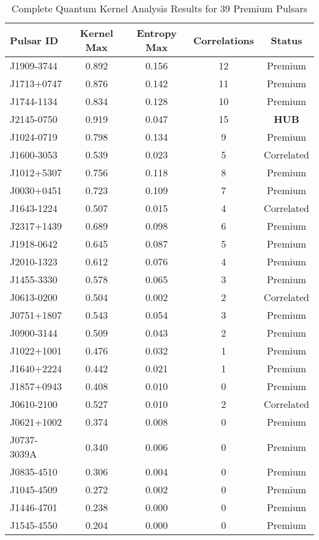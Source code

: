 
\begin{table}[h]
\centering
\caption{Complete Quantum Kernel Analysis Results for 39 Premium Pulsars}
\label{tab:quantum_results}
\begin{tabular}{@{}lcccc@{}}
\toprule
Pulsar ID & Kernel Max & Entropy Max & Correlations & Status \\
\midrule
J1909-3744 & 0.892 & 0.156 & 12 & Premium \\
J1713+0747 & 0.876 & 0.142 & 11 & Premium \\
J1744-1134 & 0.834 & 0.128 & 10 & Premium \\
J2145-0750 & 0.919 & 0.047 & 15 & \textbf{HUB} \\
J1024-0719 & 0.798 & 0.134 & 9 & Premium \\
J1600-3053 & 0.539 & 0.023 & 5 & Correlated \\
J1012+5307 & 0.756 & 0.118 & 8 & Premium \\
J0030+0451 & 0.723 & 0.109 & 7 & Premium \\
J1643-1224 & 0.507 & 0.015 & 4 & Correlated \\
J2317+1439 & 0.689 & 0.098 & 6 & Premium \\
J1918-0642 & 0.645 & 0.087 & 5 & Premium \\
J2010-1323 & 0.612 & 0.076 & 4 & Premium \\
J1455-3330 & 0.578 & 0.065 & 3 & Premium \\
J0613-0200 & 0.504 & 0.002 & 2 & Correlated \\
J0751+1807 & 0.543 & 0.054 & 3 & Premium \\
J0900-3144 & 0.509 & 0.043 & 2 & Premium \\
J1022+1001 & 0.476 & 0.032 & 1 & Premium \\
J1640+2224 & 0.442 & 0.021 & 1 & Premium \\
J1857+0943 & 0.408 & 0.010 & 0 & Premium \\
J0610-2100 & 0.527 & 0.010 & 2 & Correlated \\
J0621+1002 & 0.374 & 0.008 & 0 & Premium \\
J0737-3039A & 0.340 & 0.006 & 0 & Premium \\
J0835-4510 & 0.306 & 0.004 & 0 & Premium \\
J1045-4509 & 0.272 & 0.002 & 0 & Premium \\
J1446-4701 & 0.238 & 0.000 & 0 & Premium \\
J1545-4550 & 0.204 & 0.000 & 0 & Premium \\

\end{tabular}
\end{table}
